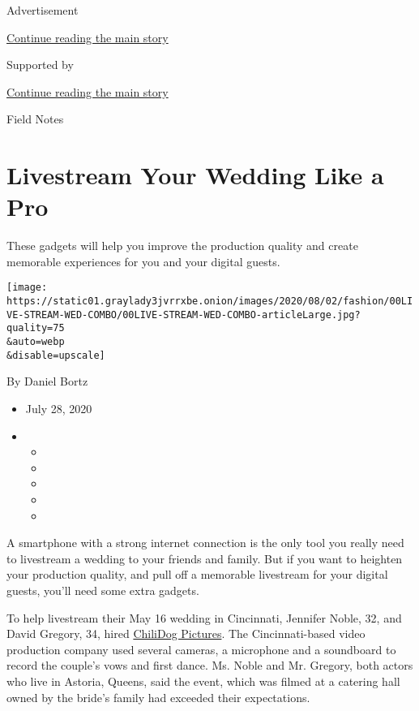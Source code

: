 Advertisement

\protect\hyperlink{after-top}{Continue reading the main story}

Supported by

\protect\hyperlink{after-sponsor}{Continue reading the main story}

Field Notes

\hypertarget{livestream-your-wedding-like-a-pro}{%
\section{Livestream Your Wedding Like a
Pro}\label{livestream-your-wedding-like-a-pro}}

These gadgets will help you improve the production quality and create
memorable experiences for you and your digital guests.

\texttt{[image: https://static01.graylady3jvrrxbe.onion/images/2020/08/02/fashion/00LIVE-STREAM-WED-COMBO/00LIVE-STREAM-WED-COMBO-articleLarge.jpg?quality=75\\\&auto=webp\\\&disable=upscale]}

By Daniel Bortz

\begin{itemize}
\item
  July 28, 2020
\item
  \begin{itemize}
  \item
  \item
  \item
  \item
  \item
  \end{itemize}
\end{itemize}

A smartphone with a strong internet connection is the only tool you
really need to livestream a wedding to your friends and family. But if
you want to heighten your production quality, and pull off a memorable
livestream for your digital guests, you'll need some extra gadgets.

To help livestream their May 16 wedding in Cincinnati, Jennifer Noble,
32, and David Gregory, 34, hired
\href{https://www.chilidogpictures.com/}{ChiliDog Pictures}. The
Cincinnati-based video production company used several cameras, a
microphone and a soundboard to record the couple's vows and first dance.
Ms. Noble and Mr. Gregory, both actors who live in Astoria, Queens, said
the event, which was filmed at a catering hall owned by the bride's
family had exceeded their expectations.

